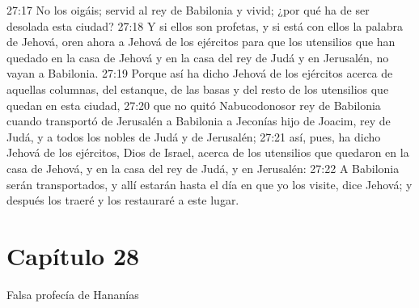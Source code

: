 27:17 No los oigáis; servid al rey de Babilonia y vivid; ¿por qué ha de ser desolada esta ciudad? 
27:18 Y si ellos son profetas, y si está con ellos la palabra de Jehová, oren ahora a Jehová de los ejércitos para que los utensilios que han quedado en la casa de Jehová y en la casa del rey de Judá y en Jerusalén, no vayan a Babilonia. 
27:19 Porque así ha dicho Jehová de los ejércitos acerca de aquellas columnas, del estanque, de las basas y del resto de los utensilios que quedan en esta ciudad, 
27:20 que no quitó Nabucodonosor rey de Babilonia cuando transportó de Jerusalén a Babilonia a Jeconías hijo de Joacim, rey de Judá, y a todos los nobles de Judá y de Jerusalén; 
27:21 así, pues, ha dicho Jehová de los ejércitos, Dios de Israel, acerca de los utensilios que quedaron en la casa de Jehová, y en la casa del rey de Judá, y en Jerusalén: 
27:22 A Babilonia serán transportados, y allí estarán hasta el día en que yo los visite, dice Jehová; y después los traeré y los restauraré a este lugar. 
\section*{Capítulo 28 }
Falsa profecía de Hananías 
 

